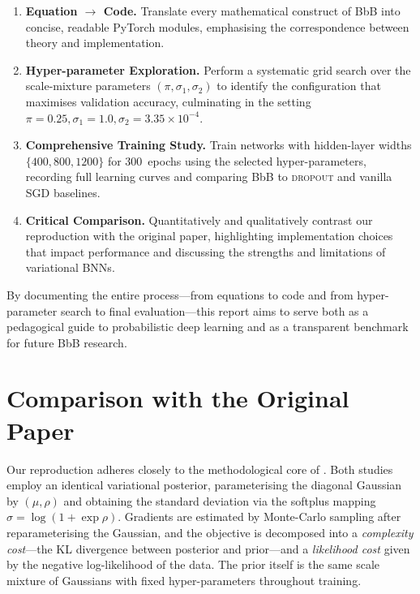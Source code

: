 \documentclass{article}
\begin{document}
\begin{enumerate}
 \item \textbf{Equation $\boldsymbol{\rightarrow}$ Code.}  Translate every mathematical construct of BbB into concise, readable PyTorch modules, emphasising the correspondence between theory and implementation.
 \item \textbf{Hyper-parameter Exploration.}  Perform a systematic grid search over the scale-mixture parameters $(\pi,\sigma_1,\sigma_2)$ to identify the configuration that maximises validation accuracy, culminating in the setting $\pi=0.25,\sigma_1=1.0,\sigma_2=3.35\times10^{-4}$.
 \item \textbf{Comprehensive Training Study.}  Train networks with hidden-layer widths $\{400,800,1200\}$ for 300~epochs using the selected hyper-parameters, recording full learning curves and comparing BbB to \textsc{dropout} and vanilla SGD baselines.
 \item \textbf{Critical Comparison.}  Quantitatively and qualitatively contrast our reproduction with the original paper, highlighting implementation choices that impact performance and discussing the strengths and limitations of variational BNNs.
\end{enumerate}

By documenting the entire process—from equations to code and from hyper-parameter search to final evaluation—this report aims to serve both as a pedagogical guide to probabilistic deep learning and as a transparent benchmark for future BbB research.

\section{Comparison with the Original Paper}

Our reproduction adheres closely to the methodological core of \citet{blundell2015weight}.  
Both studies employ an identical variational posterior, parameterising the diagonal Gaussian by $(\mu,\rho)$ and obtaining the standard deviation via the softplus mapping $\sigma=\log(1+\exp\rho)$.  
Gradients are estimated by Monte-Carlo sampling after reparameterising the Gaussian, and the objective is decomposed into a \emph{complexity cost}—the KL divergence between posterior and prior—and a \emph{likelihood cost} given by the negative log-likelihood of the data.  
The prior itself is the same scale mixture of Gaussians with fixed hyper-parameters throughout training.
\end{document}

